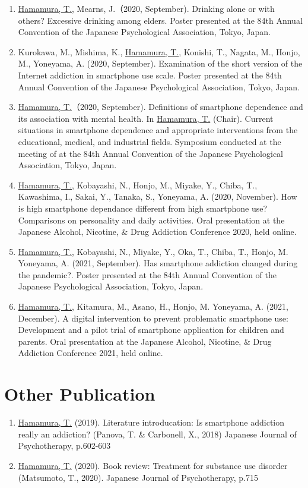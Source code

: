 \documentclass{article}
\begin{document}
\begin{enumerate}
	\item \underline{Hamamura, T.}, Mearns, J.（2020, September). Drinking alone or with others? Excessive drinking among elders. Poster presented at the 84th Annual Convention of the Japanese Psychological Association, Tokyo, Japan.
	\item Kurokawa, M., Mishima, K., \underline{Hamamura, T.}, Konishi, T., Nagata, M., Honjo, M., Yoneyama, A. (2020, September). Examination of the short version of the Internet addiction in smartphone use scale. Poster presented at the 84th Annual Convention of the Japanese Psychological Association, Tokyo, Japan.
	\item \underline{Hamamura, T.}（2020, September).  Definitions of smartphone dependence and its association with mental health.	In \underline{Hamamura, T.} (Chair). Current situations in smartphone dependence and appropriate interventions from the educational, medical, and industrial fields. Symposium conducted at the meeting of at the 84th Annual Convention of the Japanese Psychological Association, Tokyo, Japan.
	\item \underline{Hamamura, T.}, Kobayashi, N., Honjo, M., Miyake, Y., Chiba, T., Kawashima, I., Sakai, Y., Tanaka, S., Yoneyama, A. (2020, November). How is high smartphone dependance different from high smartphone use? Comparisons on personality and daily activities. Oral presentation at the Japanese Alcohol, Nicotine, \& Drug Addiction Conference 2020, held online.
	\item \underline{Hamamura, T.}, Kobayashi, N., Miyake, Y., Oka, T., Chiba, T., Honjo, M. Yoneyama, A. (2021, September). Has smartphone addiction changed during the pandemic?. Poster presented at the 84th Annual Convention of the Japanese Psychological Association, Tokyo, Japan.
	\item \underline{Hamamura, T.}, Kitamura, M., Asano, H., Honjo, M. Yoneyama, A. (2021, December). A digital intervention to prevent problematic smartphone use: Development and a pilot trial of smartphone application for children and parents. Oral presentation at the Japanese Alcohol, Nicotine, \& Drug Addiction Conference 2021, held online.
\end{enumerate}

\section{Other Publication}
	\begin{enumerate}
		\item \underline{Hamamura, T.} (2019). Literature introducation: Is smartphone addiction really an addiction? (Panova, T. \& Carbonell, X., 2018) Japanese Journal of Psychotherapy, p.602-603
		\item \underline{Hamamura, T.} (2020). Book review: Treatment for substance use disorder (Matsumoto, T., 2020). Japanese Journal of Psychotherapy, p.715
	\end{enumerate}
\end{document}
